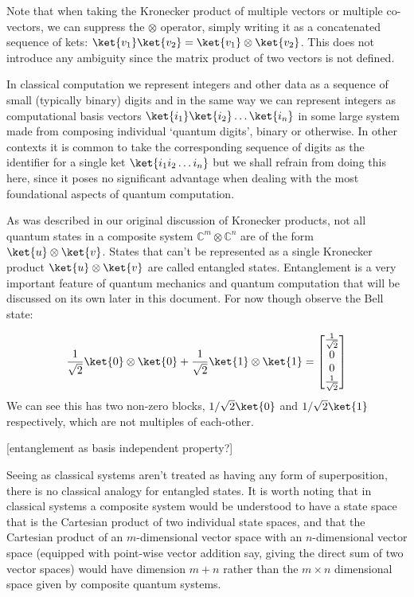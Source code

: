 Note that when taking the Kronecker product of multiple vectors or multiple co-vectors, we can suppress the $\otimes$ operator, simply writing it as a concatenated sequence of kets: $\ket{v_1}\ket{v_2} = \ket{v_1}\otimes\ket{v_2}$. This does not introduce any ambiguity since the matrix product of two vectors is not defined.

In classical computation we represent integers and other data as a sequence of small (typically binary) digits and in the same way we can represent integers as computational basis vectors $\ket{i_1}\ket{i_2}\dots\ket{i_n}$ in some large system made from composing individual `quantum digits', binary or otherwise. In other contexts it is common to take the corresponding sequence of digits as the identifier for a single ket $\ket{i_1i_2\dots i_n}$ but we shall refrain from doing this here, since it poses no significant advantage when dealing with the most foundational aspects of quantum computation.

As was described in our original discussion of Kronecker products, not all quantum states in a composite system $\mathbb{C}^m\otimes\mathbb{C}^n$ are of the form $\ket{u}\otimes\ket{v}$. States that can't be represented as a single Kronecker product $\ket{u}\otimes\ket{v}$ are called entangled states. Entanglement is a very important feature of quantum mechanics and quantum computation that will be discussed on its own later in this document. For now though observe the Bell state:

\[\frac{1}{\sqrt{2}}\ket{0}\otimes\ket{0} + \frac{1}{\sqrt{2}}\ket{1}\otimes\ket{1} = \left[\begin{matrix}
\frac{1}{\sqrt{2}}\\
0\\
0\\
\frac{1}{\sqrt{2}}
\end{matrix}\right]\]
We can see this has two non-zero blocks, $1/\sqrt{2}\ket{0}$ and $1/\sqrt{2}\ket{1}$ respectively, which are not multiples of each-other.

[entanglement as basis independent property?]

Seeing as classical systems aren't treated as having any form of superposition, there is no classical analogy for entangled states. It is worth noting that in classical systems a composite system would be understood to have a state space that is the Cartesian product of two individual state spaces, and that the Cartesian product of an $m$-dimensional vector space with an $n$-dimensional vector space (equipped with point-wise vector addition say, giving the direct sum of two vector spaces) would have dimension $m+n$ rather than the $m\times n$ dimensional space given by composite quantum systems.
